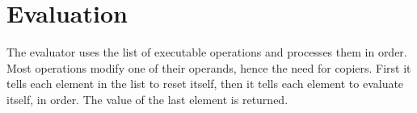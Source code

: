 \documentclass{article}
\begin{document}
\section{Evaluation}
The evaluator uses the list of executable operations and processes them in order.
Most operations modify one of their operands, hence the need for copiers.
First it tells each element in the list to reset itself, then it tells each element to evaluate itself, in order.
The value of the last element is returned.
\end{document}
